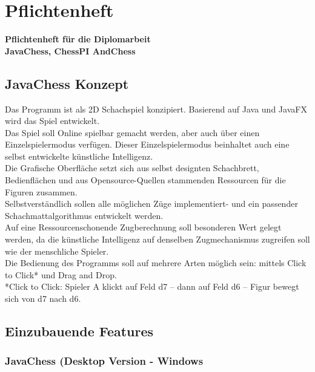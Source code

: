 \documentclass[12pt,a4paper]{article}
\begin{document}
{\section{\sc Pflichtenheft}
\vfill
	\begin{center}\begin{huge}
			\textbf{Pflichtenheft für die Diplomarbeit}\\ \vspace{1cm}
			\textbf{JavaChess, ChessPI AndChess}
	\end{huge}\end{center}
\vfill
\newpage

\subsection{\sc JavaChess Konzept}

Das Programm ist als 2D Schachspiel konzipiert. Basierend auf Java und JavaFX wird das Spiel entwickelt. \\
Das Spiel soll Online spielbar gemacht werden, aber auch über einen Einzelspielermodus verfügen. Dieser Einzelspielermodus beinhaltet auch eine selbst entwickelte künstliche Intelligenz. \\
Die Grafische Oberfläche setzt sich aus selbst designten Schachbrett, Bedienflächen und aus Opensource-Quellen stammenden Ressourcen für die Figuren zusammen.\\
Selbstverständlich sollen alle möglichen Züge implementiert- und ein passender Schachmattalgorithmus entwickelt werden. \\
Auf eine Ressourcenschonende Zugberechnung soll besonderen Wert gelegt werden, da die künstliche Intelligenz auf denselben Zugmechanismus zugreifen soll wie der menschliche Spieler. \\
Die Bedienung des Programms soll auf mehrere Arten möglich sein:  mittels Click to Click* und Drag and Drop.\\
*Click to Click: Spieler A klickt auf Feld d7 – dann auf Feld d6 – Figur bewegt sich von d7 nach d6.

\subsection{Einzubauende Features}

\subsubsection{JavaChess (Desktop Version - Windows}

}
\end{document}
